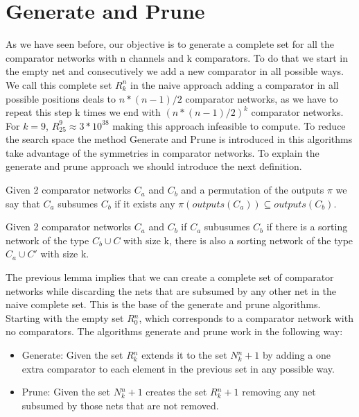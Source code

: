 \documentclass[../main.tex]{subfiles}
\begin{document}
	\section{Generate and Prune}
	As we have seen before, our objective is to generate a complete set for all the comparator networks with n channels and k comparators. To do that we start in the empty net and consecutively we add a new comparator in all possible ways. We call this complete set $R^{n}_{k}$ in the naive approach adding a comparator in all possible positions deals to $n*(n-1)/2$ comparator networks, as we have to repeat this step k times we end with $(n*(n-1)/2)^k$ comparator networks. For $k=9$, $R^{9}_{25}\approx 3*10^{38}$ making this approach infeasible to compute. To reduce the search space the method Generate and Prune is introduced in \cite{sortingnineinputs} this algorithms take advantage of the symmetries in comparator networks. To explain the generate and prune approach we should introduce the next definition.
	
	\begin{definition}
		Given 2 comparator networks $C_a$ and $C_b$ and a permutation of the outputs $\pi$ we say that $C_a$ subsumes $C_b$ if it exists any $\pi (outputs(C_a)) \subseteq outputs(C_b)$.
	\end{definition}
	
	\begin{lemma}
		Given 2 comparator networks $C_a$ and $C_b$ if $C_a$ subusumes $C_b$ if there is a sorting network of the type $C_b \cup C$ with size k, there is also a sorting network of the type $C_a \cup C'$ with size k.
	\end{lemma}
	
	The previous lemma implies that we can create a complete set of comparator networks while discarding the nets that are subsumed by any other net in the naive complete set. This is the base of the generate and prune algorithms. Starting with the empty set $R{^n_0}$, which corresponds to a comparator network with no comparators. The algorithms generate and prune work in the following way:
	
	\begin{itemize}
		\item Generate: Given the set $R{^n_k}$ extends it to the set $N{^n_k+1}$ by adding a one extra comparator to each element in the previous set in any possible way.
		\item Prune: Given the set $N{^n_k+1}$ creates the set $R{^n_k+1}$ removing any net subsumed by those nets that are not removed.
	\end{itemize}
	
	
\end{document}
